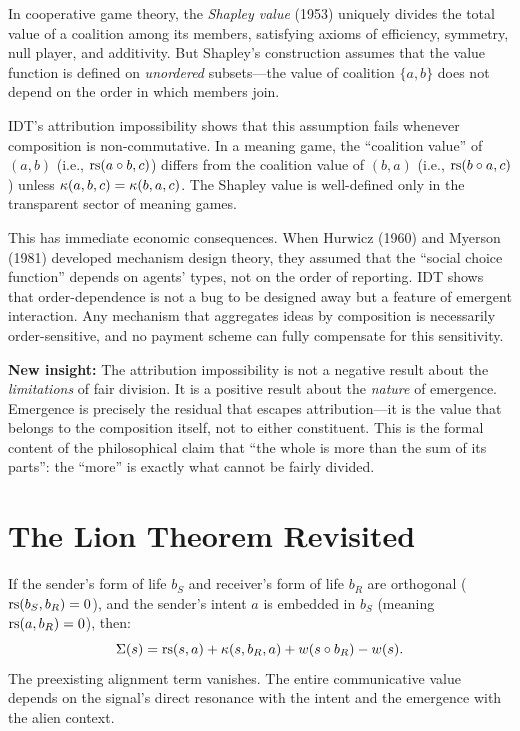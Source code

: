 \begin{interpretation}
In cooperative game theory, the \emph{Shapley value} (1953) uniquely
divides the total value of a coalition among its members, satisfying
axioms of efficiency, symmetry, null player, and additivity. But Shapley's
construction assumes that the value function is defined on \emph{unordered}
subsets---the value of coalition $\{a, b\}$ does not depend on the order
in which members join.

IDT's attribution impossibility shows that this assumption fails whenever
composition is non-commutative. In a meaning game, the ``coalition value''
of $(a, b)$ (i.e., $\mathrm{rs}(a \circ b, c)$) differs from the coalition
value of $(b, a)$ (i.e., $\mathrm{rs}(b \circ a, c)$) unless
$\kappa(a, b, c) = \kappa(b, a, c)$. The Shapley value is
well-defined only in the transparent sector of meaning games.

This has immediate economic consequences. When Hurwicz (1960) and
Myerson (1981) developed mechanism design theory, they assumed that the
``social choice function'' depends on agents' types, not on the order
of reporting. IDT shows that order-dependence is not a bug to be
designed away but a feature of emergent interaction. Any mechanism
that aggregates ideas by composition is necessarily order-sensitive,
and no payment scheme can fully compensate for this sensitivity.

\textbf{New insight:} The attribution impossibility is not a negative
result about the \emph{limitations} of fair division. It is a positive
result about the \emph{nature} of emergence. Emergence is precisely
the residual that escapes attribution---it is the value that belongs
to the composition itself, not to either constituent. This is the
formal content of the philosophical claim that ``the whole is more
than the sum of its parts'': the ``more'' is exactly what cannot be
fairly divided.
\end{interpretation}


\section{The Lion Theorem Revisited}

\begin{theorem}
\label{thm:lion-surplus}
If the sender's form of life $b_S$ and receiver's form of life $b_R$ are
orthogonal ($\mathrm{rs}(b_S, b_R) = 0$), and the sender's intent $a$ is embedded
in $b_S$ (meaning $\mathrm{rs}(a, b_R) = 0$), then:
\[
\Sigma(s) = \mathrm{rs}(s, a) + \kappa(s, b_R, a) + w(s \circ b_R) - w(s).
\]
The preexisting alignment term vanishes. The entire communicative value
depends on the signal's direct resonance with the intent and the emergence
with the alien context.
\end{theorem}

